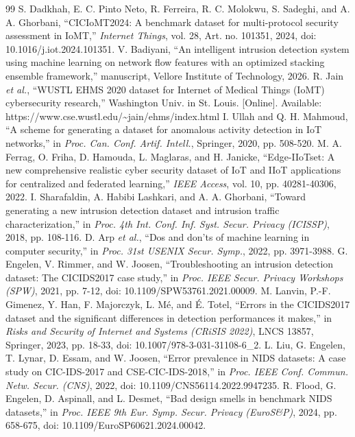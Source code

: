 \begin{thebibliography}{99}
 S. Dadkhah, E. C. Pinto Neto, R. Ferreira, R. C. Molokwu, S. Sadeghi, and A. A. Ghorbani, ``CICIoMT2024: A benchmark dataset for multi-protocol security assessment in IoMT,'' \textit{Internet Things}, vol. 28, Art. no. 101351, 2024, doi: 10.1016/j.iot.2024.101351.
 V. Badiyani, ``An intelligent intrusion detection system using machine learning on network flow features with an optimized stacking ensemble framework,'' manuscript, Vellore Institute of Technology, 2026.
 R. Jain \textit{et al.}, ``WUSTL EHMS 2020 dataset for Internet of Medical Things (IoMT) cybersecurity research,'' Washington Univ. in St. Louis. [Online]. Available: https://www.cse.wustl.edu/\~{}jain/ehms/index.html
 I. Ullah and Q. H. Mahmoud, ``A scheme for generating a dataset for anomalous activity detection in IoT networks,'' in \textit{Proc. Can. Conf. Artif. Intell.}, Springer, 2020, pp. 508-520.
 M. A. Ferrag, O. Friha, D. Hamouda, L. Maglaras, and H. Janicke, ``Edge-IIoTset: A new comprehensive realistic cyber security dataset of IoT and IIoT applications for centralized and federated learning,'' \textit{IEEE Access}, vol. 10, pp. 40281-40306, 2022.
 I. Sharafaldin, A. Habibi Lashkari, and A. A. Ghorbani, ``Toward generating a new intrusion detection dataset and intrusion traffic characterization,'' in \textit{Proc. 4th Int. Conf. Inf. Syst. Secur. Privacy (ICISSP)}, 2018, pp. 108-116.
 D. Arp \textit{et al.}, ``Dos and don'ts of machine learning in computer security,'' in \textit{Proc. 31st USENIX Secur. Symp.}, 2022, pp. 3971-3988.
 G. Engelen, V. Rimmer, and W. Joosen, ``Troubleshooting an intrusion detection dataset: The CICIDS2017 case study,'' in \textit{Proc. IEEE Secur. Privacy Workshops (SPW)}, 2021, pp. 7-12, doi: 10.1109/SPW53761.2021.00009.
 M. Lanvin, P.-F. Gimenez, Y. Han, F. Majorczyk, L. Mé, and É. Totel, ``Errors in the CICIDS2017 dataset and the significant differences in detection performances it makes,'' in \textit{Risks and Security of Internet and Systems (CRiSIS 2022)}, LNCS 13857, Springer, 2023, pp. 18-33, doi: 10.1007/978-3-031-31108-6\_2.
 L. Liu, G. Engelen, T. Lynar, D. Essam, and W. Joosen, ``Error prevalence in NIDS datasets: A case study on CIC-IDS-2017 and CSE-CIC-IDS-2018,'' in \textit{Proc. IEEE Conf. Commun. Netw. Secur. (CNS)}, 2022, doi: 10.1109/CNS56114.2022.9947235.
 R. Flood, G. Engelen, D. Aspinall, and L. Desmet, ``Bad design smells in benchmark NIDS datasets,'' in \textit{Proc. IEEE 9th Eur. Symp. Secur. Privacy (EuroS\&P)}, 2024, pp. 658-675, doi: 10.1109/EuroSP60621.2024.00042.

\end{thebibliography}
